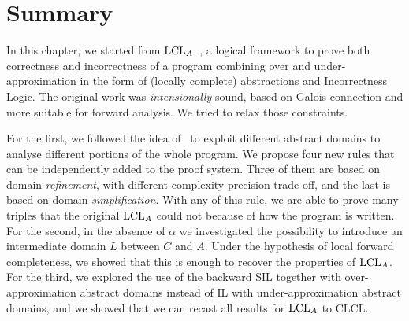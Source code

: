 \section{Summary}
In this chapter, we started from $\text{LCL}_A$~\cite{BGGR21}, a logical framework to prove both correctness and incorrectness of a program combining over and under-approximation in the form of (locally complete) abstractions and Incorrectness Logic. The original work was \emph{intensionally} sound, based on Galois connection and more suitable for forward analysis. We tried to relax those constraints.

For the first, we followed the idea of~\cite{BGGR23} to exploit different abstract domains to analyse different portions of the whole program. We propose four new rules that can be independently added to the proof system. Three of them are based on domain \emph{refinement}, with different complexity-precision trade-off, and the last is based on domain \emph{simplification}. With any of this rule, we are able to prove many triples that the original $\text{LCL}_A$ could not because of how the program is written.
For the second, in the absence of $\alpha$ we investigated the possibility to introduce an intermediate domain $L$ between $C$ and $A$. Under the hypothesis of local forward completeness, we showed that this is enough to recover the properties of $\text{LCL}_A$.
For the third, we explored the use of the backward SIL together with over-approximation abstract domains instead of IL with under-approximation abstract domains, and we showed that we can recast all results for $\text{LCL}_A$ to CLCL.

